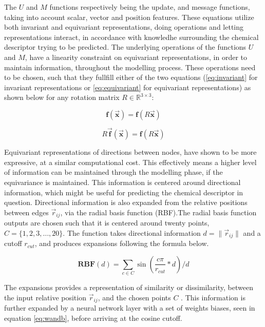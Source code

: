 The $U$ and $M$ functions respectively being the update, and message functions, taking into account scalar, vector and
position features. These equations utilize both invariant and equivariant representations, doing operations and letting
representations interact, in accordance with knowledhe surrounding the chemical descriptor trying to be predicted. The underlying
operations of the functions $U$ and $M$, have a linearity constraint on equivariant representations, in order to maintain
information, throughout the modelling process\cite{Atz2021}. These operations need to be chosen, such that they fullfill either
of the two equations (\ref{eq:invariant} for invariant representations or \ref{eq:equivariant} for equivariant representations)
as shown below for any rotation matrix $R \in \mathbb{R}^{3 \times 3}$:

\begin{equation}\label{eq:invariant}
    \mathbf{f}(\vec{\mathbf{x}}) = \mathbf{f}(R \vec{\mathbf{x}})
\end{equation}

\begin{equation}\label{eq:equivariant}
    R \vec{\mathbf{f}}(\vec{\mathbf{x}}) = \mathbf{\mathbf{f}}(R \vec{\mathbf{x}})
\end{equation}

Equivariant representations of directions between nodes, have shown to be more expressive, at a similar computational cost.
This effectively means a higher level of information can be maintained through the modelling phase, if the equivariance is
maintained. This information is centered around directional information, which might be useful for predicting the chemical
descriptor in question. Directional information is also expanded from the relative positions between edges $\vec{r}_{ij}$,
via the radial basis function (RBF)\cite{Atz2021}.The radial basis function outputs are chosen such that it is centered around twenty
points, $ C = \{1, 2, 3, \ldots, 20\}$. The function takes directional information $d = \lVert \vec{r}_{ij} \rVert$ and a cutoff
$r_{cut}$, and produces expansions following the formula below.

\begin{equation}\label{eq:rbf}
    \mathbf{RBF}(d) = \sum_{c \in C}\sin \left( \frac{c \pi}{r_{cut}} * d  \right) / d
\end{equation}

The expansions provides a representation of similarity or dissimilarity, between the input relative position $\vec{r}_{ij}$,
and the chosen points $C$ \cite{rbf}. This information is further expanded by a neural network layer with a set of weights
biases, seen in equation \ref{eq:wandb}, before arriving at the cosine cutoff.

